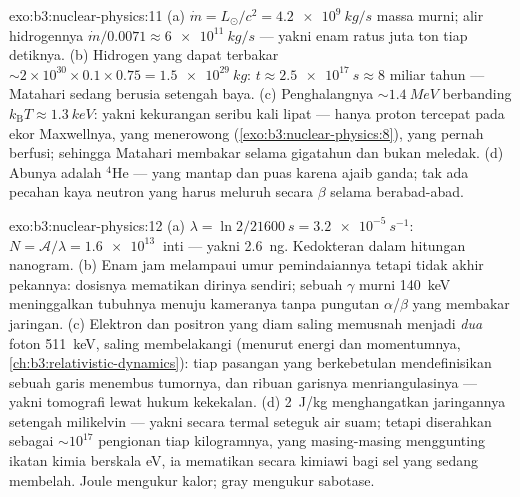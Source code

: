 \begin{solution}{exo:b3:nuclear-physics:11}
(a) $\dot m = L_\odot/c^2 = \qty{4.2e9}{kg/s}$ massa murni;
alir hidrogennya $\dot m/0.0071 \approx \qty{6e11}{kg/s}$ ---
yakni enam ratus juta ton tiap detiknya. (b) Hidrogen yang dapat terbakar
${\sim}2\times10^{30}\times0.1\times0.75 = \qty{1.5e29}{kg}$:
$t \approx \qty{2.5e17}{s} \approx 8$ miliar tahun --- Matahari
sedang berusia setengah baya. (c) Penghalangnya ${\sim}\qty{1.4}{MeV}$ berbanding
$k_{\text{B}}T \approx \qty{1.3}{keV}$: yakni kekurangan seribu kali lipat
--- hanya proton tercepat pada ekor Maxwellnya, yang menerowong
(\cref{exo:b3:nuclear-physics:8}), yang pernah berfusi; sehingga Matahari
membakar selama gigatahun dan bukan meledak. (d) Abunya adalah
$^4$He --- yang mantap dan puas karena ajaib ganda; tak ada
pecahan kaya neutron yang harus meluruh secara $\beta$ selama berabad-abad.
\end{solution}

\begin{solution}{exo:b3:nuclear-physics:12}
(a) $\lambda = \ln2/\qty{21600}{s} = \qty{3.2e-5}{s^{-1}}$:
$N = \mathcal A/\lambda = \qty{1.6e13}{}$ inti ---
yakni \qty{2.6}{ng}. Kedokteran dalam hitungan nanogram. (b) Enam jam melampaui
umur pemindaiannya tetapi tidak akhir pekannya: dosisnya mematikan dirinya sendiri; sebuah
$\gamma$ murni \qty{140}{keV} meninggalkan tubuhnya menuju kameranya
tanpa pungutan $\alpha$/$\beta$ yang membakar jaringan. (c) Elektron
dan positron yang diam saling memusnah menjadi \emph{dua}
foton \qty{511}{keV}, saling membelakangi (menurut energi dan momentumnya,
\cref{ch:b3:relativistic-dynamics}): tiap pasangan yang berkebetulan
mendefinisikan sebuah garis menembus tumornya, dan ribuan garisnya
menriangulasinya --- yakni tomografi lewat hukum kekekalan. (d)
\qty{2}{J/kg} menghangatkan jaringannya setengah milikelvin --- yakni secara termal
seteguk air suam; tetapi diserahkan sebagai ${\sim}10^{17}$ pengionan
tiap kilogramnya, yang masing-masing menggunting ikatan kimia berskala \unit{eV}, ia
mematikan secara kimiawi bagi sel yang sedang membelah. Joule mengukur kalor;
gray mengukur sabotase.
\end{solution}

